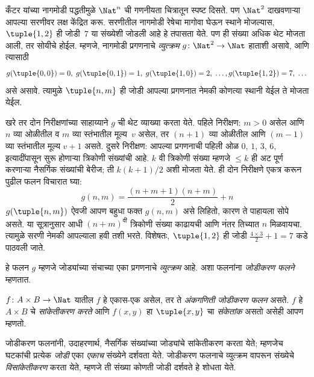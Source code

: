 \documentclass[../../../include/open-logic-section]{subfiles}
\begin{document}

\begin{explain}
कँटर यांच्या नागमोडी पद्धतीमुळे $\Nat^n$ ची गणनीयता चित्रातून
स्पष्ट दिसते. पण $\Nat^2$ दाखवणाऱ्या आपल्या सरणीवर लक्ष केंद्रित करू.
सरणीतील नागमोडी रेषेचा मागोवा घेऊन स्थाने मोजल्यास,
$\tuple{1,2}$ ही जोडी~$7$ या संख्येशी जोडली आहे हे तपासता येते.
पण ही संख्या अधिक थेट मोजता आली, तर सोयीचे होईल. म्हणजे, नागमोडी
प्रगणनाचे \emph{व्युत्क्रम} $g\colon \Nat^2 \to \Nat$ हाताशी असावे,
आणि त्यासाठी
\[
g(\tuple{0,0}) = 0, \;
g(\tuple{0,1}) = 1, \;
g(\tuple{1,0}) = 2, \; \dots,  
g(\tuple{1,2}) = 7, \; \dots
\]
असे असावे. त्यामुळे $\tuple{n, m}$ ही जोडी आपल्या प्रगणनात नेमकी
कोणत्या स्थानी येईल ते मोजता येईल.

खरे तर दोन निरीक्षणांच्या साहाय्याने $g$ ची थेट व्याख्या करता येते.
पहिले निरीक्षण: $m>0$ असेल आणि $n$ व्या ओळीतील व $m$ व्या स्तंभातील मूल्य~$v$
असेल, तर $(n+1)$ व्या ओळीतील आणि $(m-1)$ व्या स्तंभातील मूल्य
$v + 1$ असते. दुसरे निरीक्षण: आपल्या प्रगणनाची पहिली ओळ $0$, $1$,
$3$, $6$, इत्यादींपासून सुरू होणाऱ्या त्रिकोणी संख्यांची आहे.
$k$ वी त्रिकोणी संख्या म्हणजे $\le k$ ही अट पूर्ण करणाऱ्या नैसर्गिक संख्यांची
बेरीज; ती $k(k+1)/2$ अशी मोजता येते. ही दोन निरीक्षणे एकत्र करून
पुढील फलन विचारात घ्या:
\[
  g(n,m) = \frac{(n+m+1)(n+m)}{2} + n
\]
$g(\tuple{n, m})$ ऐवजी आपण बहुधा फक्त $g(n, m)$ असे लिहितो, कारण
ते पाहायला सोपे असते. या सूत्रानुसार आधी $(n+m)^\text{वी}$ त्रिकोणी
संख्या काढायची आणि नंतर तिच्यात $n$ मिळवायचा. त्यामुळे सरणी नेमकी
आपल्याला हवी तशी भरते. विशेषतः, $\tuple{1, 2}$ ही जोडी
$\frac{4 \times 3}{2} + 1 = 7$ कडे पाठवली जाते.

हे फलन $g$ म्हणजे जोड्यांच्या संचाच्या एका प्रगणनाचे \emph{व्युत्क्रम}
आहे. अशा फलनांना \emph{जोडीकरण फलने} म्हणतात.
\end{explain}

\begin{defn}
  $f\colon A \times B \to \Nat$ यातील $f$ हे एकास-एक असेल, तर ते
  \emph{अंकगणिती जोडीकरण फलन} असते. $f$ हे $A \times B$ चे
  \emph{सांकेतीकरण करते} आणि $f(x,y)$ हा $\tuple{x,y}$ चा
  \emph{संकेतांक} असतो असेही आपण म्हणतो.
\end{defn}

\begin{explain}
जोडीकरण फलनांनी, उदाहरणार्थ, नैसर्गिक संख्यांच्या जोड्यांचे
सांकेतीकरण करता येते; म्हणजेच घटकांची प्रत्येक \emph{जोडी} एका
\emph{एकाच} संख्येने दर्शवता येते. जोडीकरण फलनाचे व्युत्क्रम वापरून
संख्येचे \emph{विसांकेतीकरण} करता येते, म्हणजे ती संख्या कोणती जोडी
दर्शवते हे शोधता येते.
\end{explain}
\end{document}
